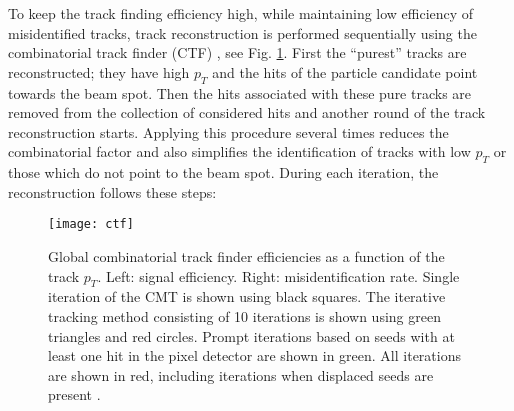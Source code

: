 To keep the track finding efficiency high, while maintaining low efficiency of misidentified tracks, track reconstruction is performed sequentially using the combinatorial track finder (CTF) \cite{combined_track_finding}, see Fig. \ref{ctf}. First the ``purest'' tracks are reconstructed; they have high $p_T$ and the hits of the particle candidate point towards the beam spot. Then the hits associated with these pure tracks are removed from the collection of considered hits and another round of the track reconstruction starts. Applying this procedure several times reduces the combinatorial factor and also simplifies the identification of tracks with low $p_T$ or those which do not point to the beam spot. During each iteration, the reconstruction follows these steps:


 \begin{figure}[H]
  \centering
  \texttt{[image: ctf]}
  \caption[Global combinatorial track finder efficiencies. ]{Global combinatorial track finder efficiencies as a function of the track $p_T$. Left: signal efficiency. Right:  misidentification rate. Single iteration of the CMT is shown using black squares. The iterative tracking method consisting of 10 iterations is shown using green triangles and red circles. Prompt iterations based on seeds with at least one hit in the pixel detector are shown in green. All iterations are shown in red, including iterations when displaced seeds are present \cite{PFalgo}.  }\label{ctf}
\end{figure}


